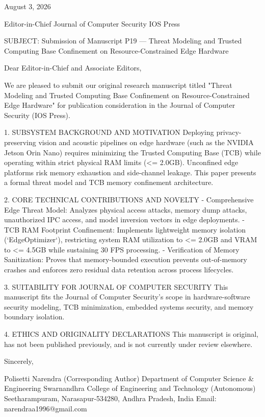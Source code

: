 August 3, 2026

Editor-in-Chief
Journal of Computer Security
IOS Press

SUBJECT: Submission of Manuscript P19 — Threat Modeling and Trusted Computing Base Confinement on Resource-Constrained Edge Hardware

Dear Editor-in-Chief and Associate Editors,

We are pleased to submit our original research manuscript titled "Threat Modeling and Trusted Computing Base Confinement on Resource-Constrained Edge Hardware" for publication consideration in the Journal of Computer Security (IOS Press).

1. SUBSYSTEM BACKGROUND AND MOTIVATION
Deploying privacy-preserving vision and acoustic pipelines on edge hardware (such as the NVIDIA Jetson Orin Nano) requires minimizing the Trusted Computing Base (TCB) while operating within strict physical RAM limits (<= 2.0GB). Unconfined edge platforms risk memory exhaustion and side-channel leakage. This paper presents a formal threat model and TCB memory confinement architecture.

2. CORE TECHNICAL CONTRIBUTIONS AND NOVELTY
  - Comprehensive Edge Threat Model: Analyzes physical access attacks, memory dump attacks, unauthorized IPC access, and model inversion vectors in edge deployments.
  - TCB RAM Footprint Confinement: Implements lightweight memory isolation (`EdgeOptimizer`), restricting system RAM utilization to <= 2.0GB and VRAM to <= 4.5GB while sustaining 30 FPS processing.
  - Verification of Memory Sanitization: Proves that memory-bounded execution prevents out-of-memory crashes and enforces zero residual data retention across process lifecycles.

3. SUITABILITY FOR JOURNAL OF COMPUTER SECURITY
This manuscript fits the Journal of Computer Security's scope in hardware-software security modeling, TCB minimization, embedded systems security, and memory boundary isolation.

4. ETHICS AND ORIGINALITY DECLARATIONS
This manuscript is original, has not been published previously, and is not currently under review elsewhere.

Sincerely,

Polisetti Narendra (Corresponding Author)
Department of Computer Science & Engineering
Swarnandhra College of Engineering and Technology (Autonomous)
Seetharampuram, Narasapur-534280, Andhra Pradesh, India
Email: narendraa1996@gmail.com
